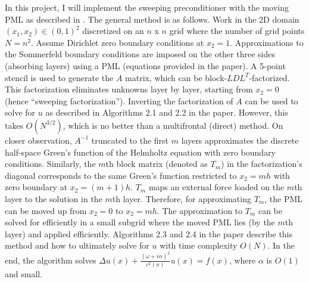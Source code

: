 \documentclass[11pt]{article}
\begin{document}
\iffalse
The frontal solver \cite{irons1970frontal} is a direct method for solving sparse 
systems in a manner similar to Gaussian elimination. The frontal solver extracts 
small blocks (fronts) within the sparse $A$ matrix for eliminating variables/equations. 
The multifrontal solver \cite{duff1983multifrontal} extends this method to process 
multiple independent fronts in parallel. For a 2D Helmholtz problem with $N=n^2$ unknowns, 
the multifrontal method takes $O(N^{3/2})$ time and $O(N \log N)$ space. The method 
becomes inefficient for 3D problems with $N=n^3$ unknowns, where it takes $O(N^2)$ 
time and $O(N^{4/3})$ space \cite{engquist2011matrix}. Direct methods also suffer 
from fill-in \cite{erlangga2008advances} that occurs during the Gaussian elimination process.
\fi

In this project, I will implement the sweeping preconditioner with the moving PML as 
described in \cite{engquist2011pml}. The general method is as follows.
Work in the 2D domain $(x_1, x_2) \in (0,1)^2$ discretized on an $n$ x $n$ grid where the number 
of grid points $N=n^2$. 
Assume Dirichlet zero boundary conditions at $x_2=1$. Approximations to the Sommerfeld 
boundary conditions are imposed on the other three sides (absorbing layers) using a PML 
(equations provided in the paper).
A 5-point stencil is used to generate the $A$ matrix, which can be block-$LDL^T$-factorized. 
This factorization eliminates unknowns layer by layer, starting from $x_2=0$ (hence ``sweeping 
factorization''). 
Inverting the factorization of $A$ can be used to solve for $u$ as described in Algorithms 
2.1 and 2.2 in the paper. However, this takes $O(N^{3/2})$, which is no better than a 
multifrontal (direct) method. On closer observation, $A^{-1}$ truncated to the first $m$ layers 
approximates the discrete half-space Green's function of the Helmholtz equation with 
zero boundary conditions. Similarly, the $m$th block matrix (denoted as $T_m$) in the 
factorization's diagonal corresponds to the same Green's function restricted to $x_2=mh$
with zero boundary at $x_2=(m+1)h$. $T_m$ maps an external force loaded on the $m$th layer 
to the solution in the $m$th layer. Therefore, for approximating $T_m$, the PML can be 
moved up from $x_2=0$ to $x_2=mh$. The approximation to $T_m$ can be solved for efficiently
in a small subgrid where the moved PML lies (by the $m$th layer) and applied
efficiently. Algorithms 2.3 and 2.4 in the paper describe this method and how to
ultimately solve for $u$ with time complexity $O(N)$. In the end, the algorithm
solves $\Delta u(x) + \frac{(\omega+i\alpha)^2}{c^2(x)}u(x)=f(x)$, where $\alpha$
is $O(1)$ and small. 







\end{document}
